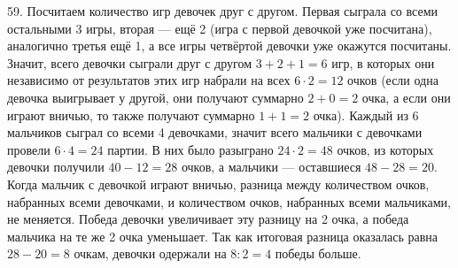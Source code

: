 59. Посчитаем количество игр девочек друг с другом. Первая сыграла со всеми остальными 3 игры, вторая --- ещё 2 (игра с первой девочкой уже посчитана), аналогично третья ещё 1, а все игры четвёртой девочки уже окажутся посчитаны. Значит, всего девочки сыграли друг с другом $3+2+1=6$ игр, в которых они независимо от результатов этих игр набрали на всех $6\cdot2=12$ очков (если одна девочка выигрывает у другой, они получают суммарно $2+0=2$ очка, а если они играют вничью, то также получают суммарно $1+1=2$ очка). Каждый из 6 мальчиков сыграл со всеми 4 девочками, значит всего мальчики с девочками провели $6\cdot4=24$ партии. В них было разыграно $24\cdot2=48$ очков, из которых девочки получили $40-12=28$ очков, а мальчики --- оставшиеся $48-28=20.$ Когда мальчик с девочкой играют вничью, разница между количеством очков, набранных всеми девочками, и количеством очков, набранных всеми мальчиками, не меняется. Победа девочки увеличивает эту разницу на 2 очка, а победа мальчика на те же 2 очка уменьшает. Так как итоговая разница оказалась равна $28-20=8$ очкам, девочки одержали на $8:2=4$ победы больше.\\
